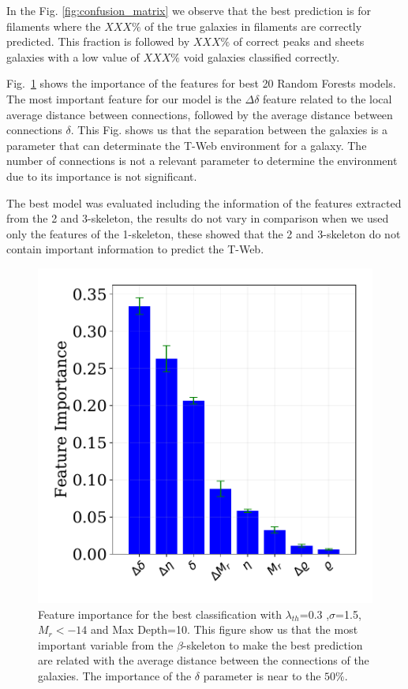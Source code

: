 \documentclass[usenatbib]{mnras}
\begin{document}
In the Fig. \ref{fig:confusion_matrix} we observe that the best prediction is for filaments where the $XXX\%$ of the true galaxies in filaments are correctly predicted. 
This fraction is followed by $XXX\%$ of correct peaks and sheets galaxies with a low value of $XXX\%$ void galaxies classified correctly.

Fig.~\ref{fig:feature_importance} shows the importance of the features for best 20 Random Forests models. The most important feature for our model is the $\Delta \delta$ feature related to the local average distance between connections, followed by the average distance between connections $\delta$. This Fig. shows us that the separation between the galaxies is a parameter that can determinate the T-Web environment for a galaxy. The number of connections is not a relevant parameter to determine the environment due to its importance is not significant.

The best model was evaluated including the information of the features extracted from the 2 and 3-skeleton, the results do not vary in comparison when we used only the features of the 1-skeleton, these showed that the 2 and 3-skeleton do not contain important information to predict the T-Web.

\begin{figure}
\centering
    \includegraphics[scale=0.45]{Figs/p_features_importance_21.pdf}  
    \caption{Feature importance for the best classification with $\lambda_{th}$=0.3 ,$\sigma$=1.5, $M_{r}<-14$ and Max Depth=10. This figure show us that the most important variable from the $\beta$-skeleton to make the best prediction are related with the average distance between the connections of the galaxies. The importance of the $\delta$ parameter is near to the $50\%$.}
    \label{fig:feature_importance}     
\end{figure}
\end{document}
